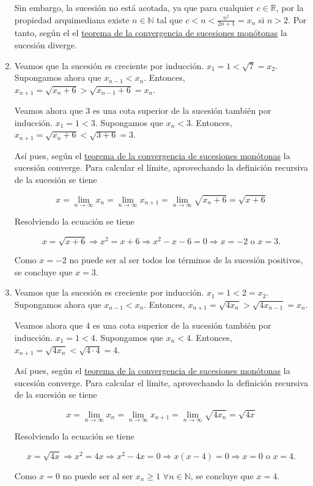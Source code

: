 \documentclass[
  a4paper,
]{scrreport}
\theoremstyle{definition}
\theoremstyle{remark}
\begin{document}
\begin{tcolorbox}
\begin{enumerate}
  Sin embargo, la sucesión no está acotada, ya que para cualquier
  \(c\in\mathbb{R}\), por la propiedad arquimediana existe
  \(n\in\mathbb{N}\) tal que \(c<n<\frac{n^2}{2n+1}=x_n\) si \(n>2\).
  Por tanto, según el el
  \href{https://aprendeconalf.es/analisis-manual/sucesiones.html\#thm-convergencia-monotona}{teorema
  de la convergencia de sucesiones monótonas} la sucesión diverge.
\item
  Veamos que la sucesión es creciente por inducción.
  \(x_1=1<\sqrt{7}=x_2\). Supongamos ahora que \(x_{n-1}<x_n\).
  Entonces, \(x_{n+1} = \sqrt{x_n+6} > \sqrt{x_{n-1}+6} = x_n\).

  Veamos ahora que \(3\) es una cota superior de la sucesión también por
  inducción. \(x_1 = 1 < 3\). Supongamos que \(x_n<3\). Entonces,
  \(x_{n+1}=\sqrt{x_n+6} < \sqrt{3+6} = 3\).

  Así pues, según el
  \href{https://aprendeconalf.es/analisis-manual/sucesiones.html\#thm-convergencia-monotona}{teorema
  de la convergencia de sucesiones monótonas} la sucesión converge. Para
  calcular el límite, aprovechando la definición recursiva de la
  sucesión se tiene

  \[
   x = \lim_{n\to\infty}x_n = \lim_{n\to\infty}x_{n+1} = \lim_{n\to\infty}\sqrt{x_n+6} = \sqrt{x+6}
   \]

  Resolviendo la ecuación se tiene

  \[
   x=\sqrt{x+6} \Rightarrow x^2=x+6 \Rightarrow x^2-x-6=0 \Rightarrow x=-2 \mbox{ o } x=3.
   \]

  Como \(x=-2\) no puede ser al ser todos los términos de la sucesión
  positivos, se concluye que \(x=3\).
\item
  Veamos que la sucesión es creciente por inducción. \(x_1=1<2=x_2\).
  Supongamos ahora que \(x_{n-1}<x_n\). Entonces,
  \(x_{n+1} = \sqrt{4x_n} > \sqrt{4x_{n-1}} = x_n\).

  Veamos ahora que \(4\) es una cota superior de la sucesión también por
  inducción. \(x_1 = 1 < 4\). Supongamos que \(x_n<4\). Entonces,
  \(x_{n+1}=\sqrt{4x_n} < \sqrt{4\cdot 4} = 4\).

  Así pues, según el
  \href{https://aprendeconalf.es/analisis-manual/sucesiones.html\#thm-convergencia-monotona}{teorema
  de la convergencia de sucesiones monótonas} la sucesión converge. Para
  calcular el límite, aprovechando la definición recursiva de la
  sucesión se tiene

  \[
   x = \lim_{n\to\infty}x_n = \lim_{n\to\infty}x_{n+1} = \lim_{n\to\infty}\sqrt{4x_n} = \sqrt{4x}
   \]

  Resolviendo la ecuación se tiene

  \[
   x=\sqrt{4x} \Rightarrow x^2=4x \Rightarrow x^2-4x=0 \Rightarrow x(x-4)=0 \Rightarrow x=0 \mbox{ o } x=4.
   \]

  Como \(x=0\) no puede ser al ser \(x_n\geq 1\)
  \(\forall n\in\mathbb{N}\), se concluye que \(x=4\).
\end{enumerate}

\end{tcolorbox}
\end{document}
